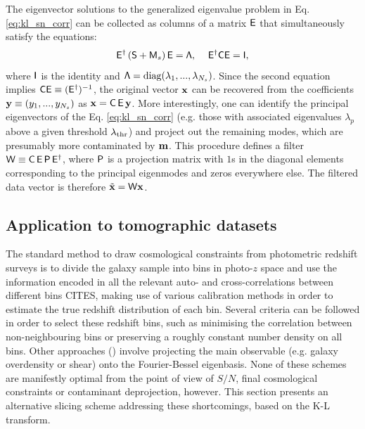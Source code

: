 \documentclass[twocolumn,amsfont,amssymb,amsmath, showpacs,balancelastpage, nofootinbib]{revtex4-1}
\begin{document}
      The eigenvector solutions to the generalized eigenvalue problem in Eq. \ref{eq:kl_sn_corr} can be collected as columns of a matrix ${\sf E}$ that simultaneously satisfy the equations:
      \begin{equation}
        {\sf E}^\dag\left({\sf S}+{\sf M}_s\right){\sf E}={\sf \Lambda},
        \hspace{12pt}
        {\sf E}^\dag{\sf C}{\sf E}={\sf I},
      \end{equation}
      where ${\sf I}$ is the identity and ${\sf \Lambda}={\rm diag}(\lambda_1,...,\lambda_{N_s})$.
      Since the second equation implies ${\sf C}{\sf E}\equiv({\sf E}^\dag)^{-1}$, the original vector ${\bf x}$ can be recovered from the coefficients ${\bf y}\equiv(y_1,...,y_{N_s})$ as ${\bf x}={\sf C}\,{\sf E}\,{\bf y}$. More interestingly, one can identify the principal eigenvectors of the Eq. \ref{eq:kl_sn_corr} (e.g. those with associated eigenvalues $\lambda_p$ above a given threshold $\lambda_{\rm thr}$) and project out the remaining modes, which are presumably more contaminated by ${\bf m}$. This procedure defines a filter ${\sf W}\equiv{\sf C}\,{\sf E}\,{\sf P}\,{\sf E}^\dag$, where ${\sf P}$ is a projection matrix with $1$s in the diagonal elements corresponding to the principal eigenmodes and zeros everywhere else. The filtered data vector is therefore $\tilde{\bf x}={\sf W}{\bf x}$.

  \subsection{Application to tomographic datasets}\label{ssec:method.tomographic}
    The standard method to draw cosmological constraints from photometric redshift surveys is to divide the galaxy sample into bins in photo-$z$ space and use the information encoded in all the relevant auto- and cross-correlations between different bins CITES, making use of various calibration methods in order to estimate the true redshift distribution of each bin. Several criteria can be followed in order to select these redshift bins, such as minimising the correlation between non-neighbouring bins or preserving a roughly constant number density on all bins. Other approaches
    (\cite{2003MNRAS.343.1327H,2007MNRAS.376..771K,2014MNRAS.442.1326K})
    involve projecting the main observable (e.g. galaxy overdensity or shear) onto the Fourier-Bessel eigenbasis. None of these schemes are manifestly optimal from the point of view of $S/N$, final cosmological constraints or contaminant deprojection, however. This section presents an alternative slicing scheme addressing these shortcomings, based on the K-L transform.
    
\end{document}
